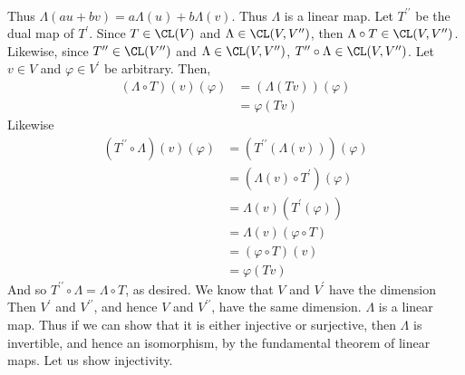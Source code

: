 \documentclass{book}
\begin{document}
\begin{enumerate}[label=\arabic*)]
\begin{enumerate}[label=\alph*)]
\begin{align*}
          \end{align*}
          Thus $\Lambda(au + bv) = a\Lambda(u) + b\Lambda(v)$. Thus $\Lambda$ is a linear map.
        \ii
          Let $T^{\prime\prime}$ be the dual map of $T^{\prime}$. Since $T \in \CL(V)$ and $\Lambda \in \CL(V, V^{\prime\prime})$, then $\Lambda\circ T \in \CL(V, V^{\prime\prime})$. Likewise,
          since $T^{\prime\prime} \in \CL(V^{\prime\prime})$ and $\Lambda \in \CL(V, V^{\prime\prime})$, $T^{\prime\prime}\circ\Lambda\in \CL(V, V^{\prime\prime})$. Let $v \in V$ and
          $\varphi \in V^{\prime}$ be arbitrary. Then,
          \begin{align*}
            (\Lambda\circ T)(v)(\varphi) & = (\Lambda(Tv))(\varphi) \\
            & = \varphi(Tv)
          \end{align*}
          Likewise 
          \begin{align*}
            (T^{\prime\prime}\circ\Lambda)(v)(\varphi) & = (T^{\prime\prime}(\Lambda(v)))(\varphi) \\
            & = (\Lambda(v) \circ T^{\prime})(\varphi) \\
            & = \Lambda(v)(T^{\prime}(\varphi)) \\
            & = \Lambda(v)(\varphi \circ T) \\
            & = (\varphi \circ T)(v) \\
            & = \varphi(Tv)
          \end{align*}
          And so $T^{\prime\prime} \circ \Lambda = \Lambda \circ T$, as desired.
        \ii
          We know that $V$ and $V^{\prime}$ have the dimension Then $V^{\prime}$ and $V^{\prime\prime}$, and hence $V$ and $V^{\prime\prime}$, have the same dimension. $\Lambda$ is a linear
          map. Thus if we can show that it is either injective or surjective, then $\Lambda$ is invertible, and hence an isomorphism, by the fundamental theorem of linear maps. Let us show
          injectivity. 


\end{enumerate}
\end{enumerate}
\end{document}
